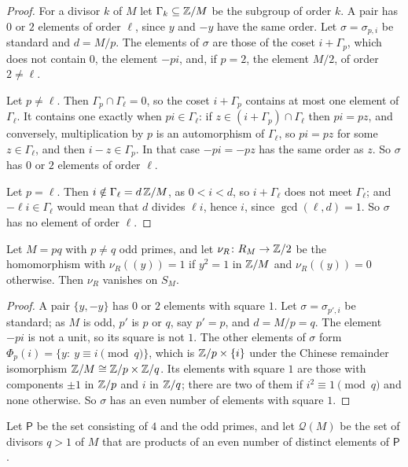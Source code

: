 \begin{proof}
For a divisor $k$ of $M$ let $\Gamma_{k}\subseteq\mathbb{Z}/M$ be the subgroup of
order $k$. A pair has $0$ or $2$ elements of order $\ell$, since $y$ and
$-y$ have the same order. Let $\sigma=\sigma_{p,i}$ be standard and
$d=M/p$. The elements of $\sigma$ are those of the coset $i+\Gamma_{p}$,
which does not contain $0$, the element $-pi$, and, if $p=2$, the element
$M/2$, of order $2\ne\ell$.

Let $p\ne\ell$. Then $\Gamma_{p}\cap\Gamma_{\ell}=0$, so the coset
$i+\Gamma_{p}$ contains at most one element of $\Gamma_{\ell}$. It contains
one exactly when $pi\in\Gamma_{\ell}$: if $z\in(i+\Gamma_{p})\cap
\Gamma_{\ell}$ then $pi=pz$, and conversely, multiplication by $p$ is an
automorphism of $\Gamma_{\ell}$, so $pi=pz$ for some $z\in\Gamma_{\ell}$,
and then $i-z\in\Gamma_{p}$. In that case $-pi=-pz$ has the same order as
$z$. So $\sigma$ has $0$ or $2$ elements of order $\ell$.

Let $p=\ell$. Then $i\notin\Gamma_{\ell}=d\,\mathbb{Z}/M$, as $0<i<d$, so
$i+\Gamma_{\ell}$ does not meet $\Gamma_{\ell}$; and $-\ell i\in
\Gamma_{\ell}$ would mean that $d$ divides $\ell i$, hence $i$, since
$\gcd(\ell,d)=1$. So $\sigma$ has no element of order $\ell$.
\end{proof}

\begin{lemma}\label{lem:nusqrt}
Let $M=pq$ with $p\ne q$ odd primes, and let $\nu_{R}\colon R_{M}\to\mathbb{Z}/2$
be the homomorphism with $\nu_{R}((y))=1$ if $y^{2}=1$ in $\mathbb{Z}/M$ and
$\nu_{R}((y))=0$ otherwise. Then $\nu_{R}$ vanishes on $S_{M}$.
\end{lemma}

\begin{proof}
A pair $\{y,-y\}$ has $0$ or $2$ elements with square $1$. Let
$\sigma=\sigma_{p',i}$ be standard; as $M$ is odd, $p'$ is $p$ or $q$, say
$p'=p$, and $d=M/p=q$. The element $-pi$ is not a unit, so its square is not
$1$. The other elements of $\sigma$ form $\Phi_{p}(i)=\{y:\ y\equiv
i\pmod q\}$, which is $\mathbb{Z}/p\times\{i\}$ under the Chinese remainder
isomorphism $\mathbb{Z}/M\cong\mathbb{Z}/p\times\mathbb{Z}/q$. Its elements with square $1$ are
those with components $\pm1$ in $\mathbb{Z}/p$ and $i$ in $\mathbb{Z}/q$; there are two of
them if $i^{2}\equiv1\pmod q$ and none otherwise. So $\sigma$ has an even number of elements with square $1$.
\end{proof}

Let $\mathsf P$ be the set consisting of $4$ and the odd primes, and let
$\mathcal Q(M)$ be the set of divisors $q>1$ of $M$ that are products of an
even number of distinct elements of $\mathsf P$.

